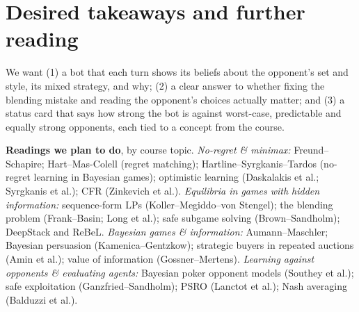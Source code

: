 \documentclass[10pt]{article}
\begin{document}
\section{Desired takeaways and further reading}
We want (1) a bot that each turn shows its beliefs about the opponent's set and style, its mixed strategy, and why; (2) a clear answer to whether fixing the blending mistake and reading the opponent's choices actually matter; and (3) a status card that says how strong the bot is against worst-case, predictable and equally strong opponents, each tied to a concept from the course.

\textbf{Readings we plan to do}, by course topic. \emph{No-regret \& minimax:} Freund--Schapire; Hart--Mas-Colell (regret matching); Hartline--Syrgkanis--Tardos (no-regret learning in Bayesian games); optimistic learning (Daskalakis et al.; Syrgkanis et al.); CFR (Zinkevich et al.).
\emph{Equilibria in games with hidden information:} sequence-form LPs (Koller--Megiddo--von Stengel); the blending problem (Frank--Basin; Long et al.); safe subgame solving (Brown--Sandholm); DeepStack and ReBeL.
\emph{Bayesian games \& information:} Aumann--Maschler; Bayesian persuasion (Kamenica--Gentzkow); strategic buyers in repeated auctions (Amin et al.); value of information (Gossner--Mertens).
\emph{Learning against opponents \& evaluating agents:} Bayesian poker opponent models (Southey et al.); safe exploitation (Ganzfried--Sandholm); PSRO (Lanctot et al.); Nash averaging (Balduzzi et al.).
\end{document}
